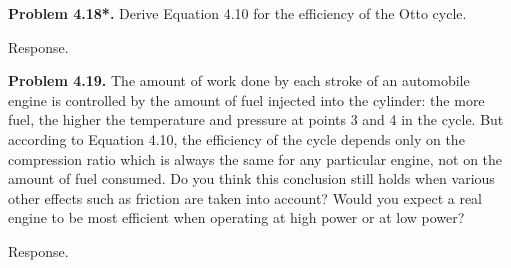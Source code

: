 \documentclass[a4paper, 12pt]{config/homework}
\begin{document}
\pagebreak
\noindent
\textbf{Problem 4.18*.} Derive Equation 4.10 for the efficiency of the Otto cycle.

\bigskip
\noindent
Response.

\pagebreak
\noindent
\textbf{Problem 4.19.} The amount of work done by each stroke of an automobile engine is controlled by the amount of fuel injected into the cylinder: the more fuel, the higher the temperature and pressure at points 3 and 4 in the cycle. But according to Equation 4.10, the efficiency of the cycle depends only on the compression ratio which is always the same for any particular engine, not on the amount of fuel consumed. Do you think this conclusion still holds when various other effects such as friction are taken into account? Would you expect a real engine to be most efficient when operating at high power or at low power?

\bigskip
\noindent
Response.
\end{document}
